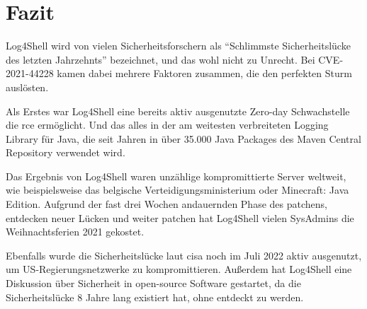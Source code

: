 
\section{Fazit}\label{sec:fazit}
Log4Shell wird von vielen Sicherheitsforschern als ``Schlimmste Sicherheitslücke des letzten Jahrzehnts'' bezeichnet, und das wohl nicht zu Unrecht.
Bei CVE-2021-44228 kamen dabei mehrere Faktoren zusammen, die den perfekten Sturm auslösten.

Als Erstes war Log4Shell eine bereits aktiv ausgenutzte Zero-day Schwachstelle die \gls{rce} ermöglicht.
Und das alles in der am weitesten verbreiteten Logging Library für Java, die seit Jahren in über 35.000 Java Packages des Maven Central Repository verwendet wird.

Das Ergebnis von Log4Shell waren unzählige kompromittierte Server weltweit, wie beispielsweise das belgische Verteidigungsministerium oder Minecraft: Java Edition.
Aufgrund der fast drei Wochen andauernden Phase des patchens, entdecken neuer Lücken und weiter patchen hat Log4Shell vielen SysAdmins die Weihnachtsferien 2021 gekostet.

Ebenfalls wurde die Sicherheitslücke laut \gls{cisa} noch im Juli 2022 aktiv ausgenutzt, um US-Regierungsnetzwerke zu kompromittieren.
Außerdem hat Log4Shell eine Diskussion über Sicherheit in open-source Software gestartet, da die Sicherheitslücke 8 Jahre lang existiert hat, ohne entdeckt zu werden.
